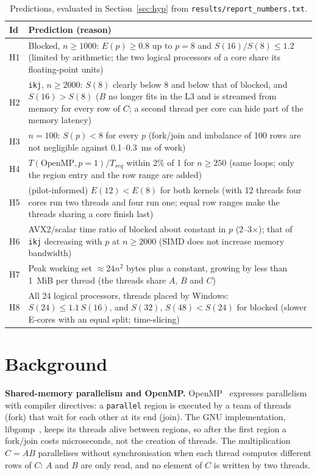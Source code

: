 \documentclass[11pt,a4paper]{article}
\begin{document}
\begin{table}[H]
\centering
\small
\setlength{\tabcolsep}{4pt}
\begin{tabular}{>{\raggedright\arraybackslash}p{0.7cm}p{14.5cm}}
\toprule
\textbf{Id} & \textbf{Prediction (reason)} \\
\midrule
H1 & Blocked, $n \ge 1000$: $E(p) \ge 0.8$ up to $p = 8$ and $S(16)/S(8) \le 1.2$ (limited by
arithmetic; the two logical processors of a core share its floating-point units) \\
H2 & \texttt{ikj}, $n \ge 2000$: $S(8)$ clearly below 8 and below that of blocked, and
$S(16) > S(8)$ ($B$ no longer fits in the L3 and is streamed from memory for every row of
$C$; a second thread per core can hide part of the memory latency) \\
H3 & $n = 100$: $S(p) < 8$ for every $p$ (fork/join and imbalance of 100 rows are not
negligible against 0.1--0.3~ms of work) \\
H4 & $T(\text{OpenMP}, p = 1) / T_{seq}$ within 2\% of 1 for $n \ge 250$ (same loops; only the
region entry and the row range are added) \\
H5 & (pilot-informed) $E(12) < E(8)$ for both kernels (with 12 threads four cores run two
threads and four run one; equal row ranges make the threads sharing a core finish last) \\
H6 & AVX2/scalar time ratio of blocked about constant in $p$ (2--3$\times$); that of
\texttt{ikj} decreasing with $p$ at $n \ge 2000$ (SIMD does not increase memory bandwidth) \\
H7 & Peak working set $\approx 24n^2$ bytes plus a constant, growing by less than 1~MiB per
thread (the threads share $A$, $B$ and $C$) \\
H8 & All 24 logical processors, threads placed by Windows: $S(24) \le 1.1\,S(16)$, and
$S(32)$, $S(48) < S(24)$ for blocked (slower E-cores with an equal split; time-slicing) \\
\bottomrule
\end{tabular}
\caption{Predictions, evaluated in Section~\ref{sec:hyp} from \texttt{results/report\_numbers.txt}.}
\label{tab:predictions}
\end{table}

\section{Background}

\textbf{Shared-memory parallelism and OpenMP.} OpenMP~\cite{openmp52} expresses
parallelism with compiler directives: a \texttt{parallel} region is executed by a team of
threads (fork) that wait for each other at its end (join). The GNU implementation,
libgomp~\cite{libgomp}, keeps its threads alive between regions, so after the first region a
fork/join costs microseconds, not the creation of threads. The multiplication $C = AB$
parallelises without synchronisation when each thread computes different rows of $C$: $A$
and $B$ are only read, and no element of $C$ is written by two threads.
\end{document}
